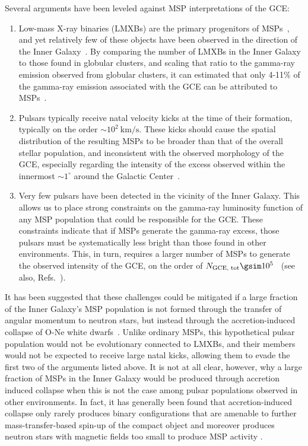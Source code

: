 Several arguments have been leveled against 
MSP interpretations of the GCE:
\begin{enumerate}
%
\item{Low-mass X-ray binaries (LMXBs) are the primary progenitors of MSPs~\cite{1982Natur.300..728A,2009Sci...324.1411A}, and yet relatively few of these objects have been observed in the direction of the Inner Galaxy~\cite{Cholis:2014lta}. By comparing the number of LMXBs in the Inner Galaxy to those found in globular clusters, and scaling that ratio to the gamma-ray emission observed from globular clusters, it can estimated that only 4-11\% of the gamma-ray emission associated with the GCE can be attributed to MSPs~\cite{Haggard:2017lyq}.}
%
\item{Pulsars typically receive natal velocity kicks at the time of their formation, typically on the order $\sim 10^2~\textrm{km/s}$. These kicks should cause the spatial distribution of the resulting MSPs to be broader than that of the overall stellar population, and inconsistent with the observed morphology of the GCE, especially regarding the intensity of the excess observed within the innermost $\sim 1^{\circ}$ around the Galactic Center~\cite{Boodram:2022lpn}.}
%
\item{Very few pulsars have been detected in the vicinity of the Inner Galaxy. This allows us to place strong constraints on the gamma-ray luminosity function of any MSP population that could be responsible for the GCE. These constraints indicate that if MSPs generate the gamma-ray excess, those pulsars must be systematically less bright than those found in other environments. This, in turn, requires a larger number of MSPs to generate the observed intensity of the GCE, on the order of $N_\textrm{GCE, tot} \gsim 10^5$~\cite{Holst:2024fvb} (see also, Refs.~\cite{Cholis:2014noa,Hooper:2016rap,Hooper:2015jlu,Bartels:2018xom,Ploeg:2017vai,Ploeg:2020jeh,Dinsmore:2021nip}).}
%
\end{enumerate}

It has been suggested that these challenges could be mitigated if a large fraction of the Inner Galaxy's MSP population is not formed through the transfer of angular momentum to neutron stars, but instead through the accretion-induced collapse of O-Ne white dwarfs~\cite{Gautam:2021wqn}. Unlike ordinary MSPs, this hypothetical pulsar population would not be evolutionary connected to LMXBs, and their members would not be expected to receive large natal kicks, allowing them to evade the first two of the arguments listed above. It is not at all clear, however, why a large fraction of MSPs in the Inner Galaxy would be produced through accretion induced collapse when this is not the case among pulsar populations observed in other environments. 
% 
In fact, it has generally
been found that accretion-induced collapse only rarely produces binary configurations that are amenable to further mass-transfer-based spin-up of the compact object \cite{Kalogera_1996, Willems_2004} and moreover produces neutron stars with magnetic fields too
small to produce MSP activity \cite{Wijers_1997, sutantyo2000formationbinarymillisecondpulsars}.

